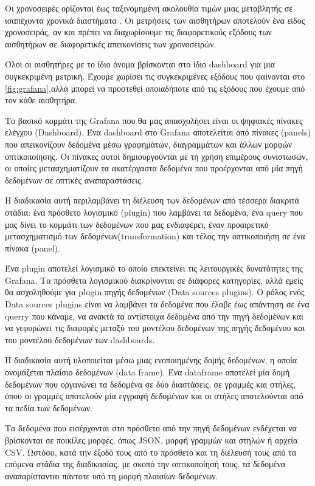Οι χρονοσειρές ορίζονται έως ταξινομημένη ακολουθία τιμών μιας μεταβλητής σε ισαπέχοντα χρονικά διαστήματα \cite{timeSeriesDefinition}.
Οι μετρήσεις των αισθητήρων αποτελούν ένα είδος χρονοσειράς, αν και πρέπει να διαχωρίσουμε τις διαφορετικούς εξόδους των αισθητήρων
σε διαφορετικές απεικονίσεις των χρονοσειρών.

 Όλοι οι αισθητήρες με το ίδιο όνομα βρίσκονται στο ίδιο dashboard για μια συγκεκριμένη μετρική.
Έχουμε χωρίσει τις συγκεκριμένες εξόδους που φαίνονται στο \ref{fig:grafana},αλλά μπορεί να προστεθεί οποιαδήποτε από τις εξόδους που έχουμε από τον κάθε αισθητήρα.

Το βασικό κομμάτι της Grafana που θα μας απασχολήσει είναι οι ψηφιακές πίνακες ελέγχου (Dashboard).
Ένα dashboard στο Grafana αποτελείται από πίνακες (panels) που απεικονίζουν δεδομένα μέσω γραφημάτων, διαγραμμάτων και άλλων μορφών οπτικοποίησης. 
Οι πίνακες αυτοί δημιουργούνται με τη χρήση επιμέρους συνιστωσών, οι οποίες μετασχηματίζουν τα ακατέργαστα δεδομένα που προέρχονται από μία πηγή δεδομένων σε οπτικές αναπαραστάσεις. 

Η διαδικασία αυτή περιλαμβάνει τη διέλευση των δεδομένων από τέσσερα διακριτά στάδια: ένα πρόσθετο λογισμικό (plugin) που λαμβάνει τα δεδομένα, 
ένα query που μας δίνει το κομμάτι των δεδομένων που μας ενδιαφέρει, έναν προαιρετικό μετασχηματισμό των δεδομένων(transformation) και τέλος την οπτικοποιήση σε ένα πίνακα (panel). 

Ένα plugin αποτελεί λογισμικό το οποίο επεκτείνει τις λειτουργικές δυνατότητες της Grafana. 
Τα πρόσθετα λογισμικού διακρίνονται σε διάφορες κατηγορίες, αλλά εμείς θα ασχοληθούμε για plugin πηγής δεδομένων (Data sources plugins).
 Ο ρόλος ενός Data sources plugins είναι να λαμβάνει τα δεδομένα που έλαβε έως απάντηση σε ένα querry που κάναμε,
 να ανακτά τα αντίστοιχα δεδομένα από την πηγή δεδομένων και να γεφυρώνει τις διαφορές μεταξύ του μοντέλου δεδομένων της πηγής δεδομένου και του μοντέλου δεδομένων των dashboards.

Η διαδικασία αυτή υλοποιείται μέσω μιας ενοποιημένης δομής δεδομένων, η οποία ονομάζεται πλαίσιο δεδομένων (data frame).
Ένα dataframe αποτελεί μία δομή δεδομένων που οργανώνει τα δεδομένα σε δύο διαστάσεις, σε γραμμές και στήλες, όπου οι γραμμές αποτελούν μία εγγραφή δεδομένων και οι στήλες αποτελούνται από τα πεδία των δεδομένων.

Τα δεδομένα που εισέρχονται στο πρόσθετο από την πηγή δεδομένων ενδέχεται να βρίσκονται σε ποικίλες μορφές, όπως JSON, μορφή γραμμών και στηλών ή αρχεία CSV.
Ωστόσο, κατά την έξοδό τους από το πρόσθετο και τη διέλευσή τους από τα επόμενα στάδια της διαδικασίας, με σκοπό την οπτικοποίησή τους, τα δεδομένα αναπαρίστανται πάντοτε υπό τη μορφή πλαισίων δεδομένων.

